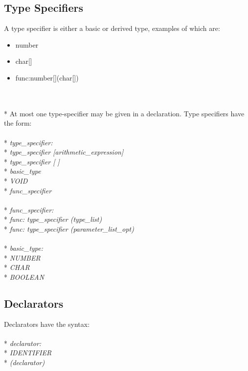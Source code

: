 \documentclass[11pt]{article}
\newcommand{\tab}{\hspace*{2em}}
\begin{document}
\subsection{Type Specifiers}
A type specifier is either a basic or derived type, examples of which are:
\begin{itemize}
\item
number
\item
char[]
\item
func:number[](char[])
\end{itemize}
\\ \\* At most one type-specifier may be given in a declaration. Type specifiers have the form:
\\ \\* \tab \emph{type\_specifier:}
\\* \tab \tab \emph{type\_specifier [arithmetic\_expression]}
\\* \tab \tab \emph{type\_specifier [ ]}
\\* \tab \tab \emph{basic\_type}
\\* \tab \tab \emph{VOID}
\\* \tab \tab \emph{func\_specifier}
\\ \\* \tab \emph{func\_specifier:}
\\* \tab \tab \emph{func: type\_specifier (type\_list)}
\\* \tab \tab \emph{func: type\_specifier (parameter\_list\_opt)}
\\ \\* \tab \emph{basic\_type:}
\\* \tab \tab \emph{NUMBER}
\\* \tab \tab \emph{CHAR}
\\* \tab \tab \emph{BOOLEAN}

\subsection{Declarators}
Declarators have the syntax:
\\ \\* \tab \emph{declarator:}
\\* \tab \tab \emph{IDENTIFIER}
\\* \tab \tab \emph{(declarator)}
\end{document}
